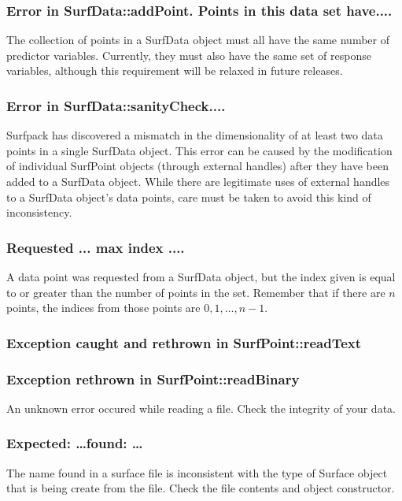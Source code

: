 \documentclass{article}
\begin{document}
\subsubsection{Error in SurfData::addPoint. Points in this data set have....}
The collection of points in a SurfData object must all have the same number of
predictor variables.  Currently, they must also have the same set of response
variables, although this requirement will be relaxed in future releases.

\subsubsection{Error in SurfData::sanityCheck....} 
Surfpack has discovered a mismatch in the dimensionality of at least two data
points in a single SurfData object.  This error can be caused by the
modification of individual SurfPoint objects (through external handles) after
they have been added to a SurfData object.  While there are legitimate uses of
external handles to a SurfData object's data points, care must be taken to avoid
this kind of inconsistency.

\subsubsection{Requested ... max index ....}
A data point was requested from a SurfData object, but the index given is equal
to or greater than the number of points in the set.  Remember that if there are
$n$ points, the indices from those points are $0, 1, \ldots, n-1$.

\subsubsection{Exception caught and rethrown in SurfPoint::readText}
\subsubsection{Exception rethrown in SurfPoint::readBinary}
An unknown error occured while reading a file.  Check the integrity of your
data.

\subsubsection{Expected: \ldots found: \ldots} 
The name found in a surface file is inconsistent with the type of Surface object
that is being create from the file.  Check the file contents and object
constructor.
\end{document}
